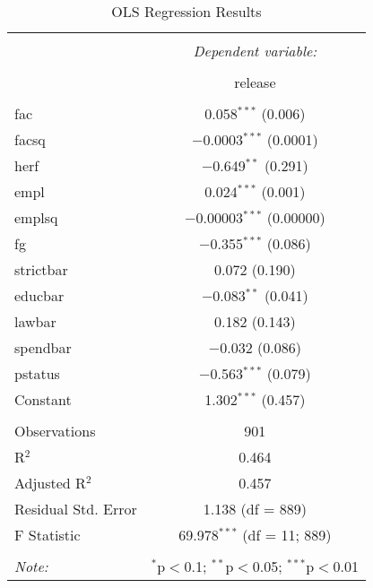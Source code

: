 
\begin{table}[!htbp] \centering 
  \caption{OLS Regression Results} 
  \label{} 
\begin{tabular}{@{\extracolsep{5pt}}lc} 
\\[-1.8ex]\hline 
\hline \\[-1.8ex] 
 & \multicolumn{1}{c}{\textit{Dependent variable:}} \\ 
\cline{2-2} 
\\[-1.8ex] & release \\ 
\hline \\[-1.8ex] 
 fac & 0.058$^{***}$ (0.006) \\ 
  facsq & $-$0.0003$^{***}$ (0.0001) \\ 
  herf & $-$0.649$^{**}$ (0.291) \\ 
  empl & 0.024$^{***}$ (0.001) \\ 
  emplsq & $-$0.00003$^{***}$ (0.00000) \\ 
  fg & $-$0.355$^{***}$ (0.086) \\ 
  strictbar & 0.072 (0.190) \\ 
  educbar & $-$0.083$^{**}$ (0.041) \\ 
  lawbar & 0.182 (0.143) \\ 
  spendbar & $-$0.032 (0.086) \\ 
  pstatus & $-$0.563$^{***}$ (0.079) \\ 
  Constant & 1.302$^{***}$ (0.457) \\ 
 \hline \\[-1.8ex] 
Observations & 901 \\ 
R$^{2}$ & 0.464 \\ 
Adjusted R$^{2}$ & 0.457 \\ 
Residual Std. Error & 1.138 (df = 889) \\ 
F Statistic & 69.978$^{***}$ (df = 11; 889) \\ 
\hline 
\hline \\[-1.8ex] 
\textit{Note:}  & \multicolumn{1}{r}{$^{*}$p$<$0.1; $^{**}$p$<$0.05; $^{***}$p$<$0.01} \\ 
\end{tabular} 
\end{table} 
